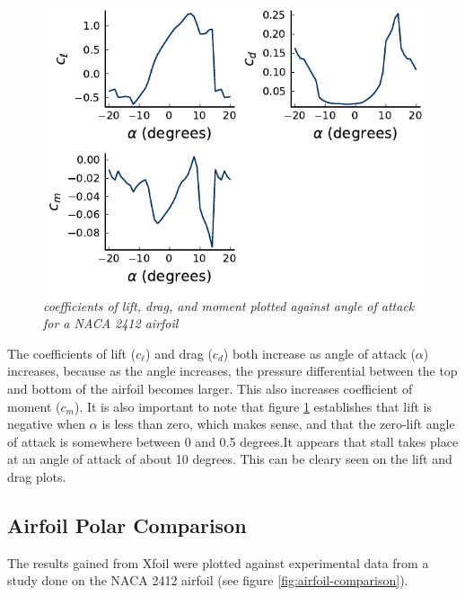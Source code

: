 \documentclass{journal}
\begin{document}
	\begin{figure}
		\centering
		\includegraphics{../graphics/aoa-coefficients.pdf}
		\caption{\emph{coefficients of lift, drag, and moment plotted against angle of attack for a NACA 2412 airfoil}}
		\label{fig:aoa-coefficients}
	\end{figure}
	
	The coefficients of lift (\(c_\ell\)) and drag (\(c_d\)) both increase as angle of attack (\(\alpha\)) increases, because as the angle increases, the pressure differential between the top and bottom of the airfoil becomes larger. This also increases coefficient of moment (\(c_m\)). It is also important to note that figure \ref{fig:aoa-coefficients} establishes that lift is negative when \(\alpha\) is less than zero, which makes sense, and that the zero-lift angle of attack is somewhere between 0 and 0.5 degrees.It appears that stall takes place at an angle of attack of about 10 degrees. This can be cleary seen on the lift and drag plots.
	
	\subsection{Airfoil Polar Comparison}
	The results gained from Xfoil were plotted against experimental data from a study done on the NACA 2412 airfoil (see figure \ref{fig:airfoil-comparison}).
	
\end{document}
